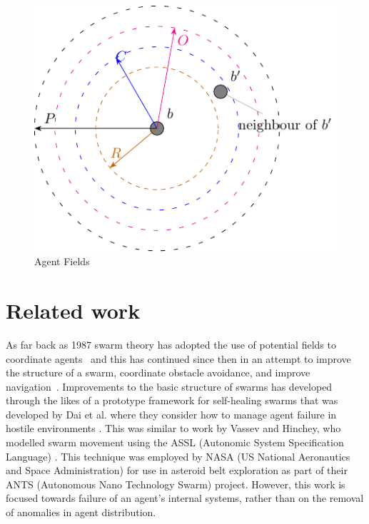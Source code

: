 \documentclass[12pt,a4paper]{IEEEtran}
\begin{document}
\begin{figure}[H]
	\centering
	\includegraphics[width=0.7\linewidth]{figures/stableswarm}
	\caption[Agent Fields]{Agent Fields}
	\label{fig:stableswarm}
\end{figure}

\section{Related work}
As far back as 1987 swarm theory has adopted the use of potential fields to coordinate agents~\cite{REY:87} and this has continued since then in an attempt to improve the structure of a swarm, coordinate obstacle avoidance, and improve navigation~\cite{BAFVM:06,BAF:06,BFV:07,BM:09,eliot2018metric,VG:05,HC:09,SW:03,Son2017}. Improvements to the basic structure of swarms has developed through the likes of a prototype framework for self-healing swarms that was developed by Dai et al. where they consider how to manage agent failure in hostile environments \cite{DHMRZ:06}. This was similar to work by Vassev and Hinchey, who modelled swarm movement using the ASSL (Autonomic System Specification Language) \cite{VH:09}. This technique was employed by NASA (US National Aeronautics and Space Administration) for use in asteroid belt exploration as part of their ANTS (Autonomous Nano Technology Swarm) project. However, this work is focused towards failure of an agent's internal systems, rather than on the removal of anomalies in agent distribution. 
\end{document}
